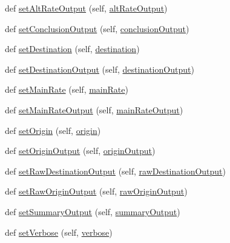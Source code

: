 \begin{DoxyCompactItemize}
def \hyperlink{classe2e_1_1_parameters_a47d3280dcce660c7227ca8c817859d84}{set\+Alt\+Rate\+Output} (self, \hyperlink{classe2e_1_1_parameters_ab0fc4de0f4d6d135eea22cae77536807}{alt\+Rate\+Output})
\item 
def \hyperlink{classe2e_1_1_parameters_a4ec249739947f4643b6d2dc811ef2639}{set\+Conclusion\+Output} (self, \hyperlink{classe2e_1_1_parameters_ad5967b78ebf5c8778e423413053015a7}{conclusion\+Output})
\item 
def \hyperlink{classe2e_1_1_parameters_ac63ae6d2b5f45ae78ee855953a038f14}{set\+Destination} (self, \hyperlink{classe2e_1_1_parameters_ad2cdf746b8890c53a9cab6fd7df7043b}{destination})
\item 
def \hyperlink{classe2e_1_1_parameters_a96083de53012ca50d2a345a1673802de}{set\+Destination\+Output} (self, \hyperlink{classe2e_1_1_parameters_a3b4ae5aa9b73466e51018b6f37792577}{destination\+Output})
\item 
def \hyperlink{classe2e_1_1_parameters_a8cea2f8656650dfbc2f4b9c13bce46a4}{set\+Main\+Rate} (self, \hyperlink{classe2e_1_1_parameters_a3d473f94dbb62a1488945cf6abc9f108}{main\+Rate})
\item 
def \hyperlink{classe2e_1_1_parameters_a930e9e6cafab4096286754a473617232}{set\+Main\+Rate\+Output} (self, \hyperlink{classe2e_1_1_parameters_acff858a94aecf1e5a553273e8acd9eca}{main\+Rate\+Output})
\item 
def \hyperlink{classe2e_1_1_parameters_a421e56e53ff0aaf5222229d8a81c456b}{set\+Origin} (self, \hyperlink{classe2e_1_1_parameters_aff4d7aaa35295f7f71e546fe5554c4d9}{origin})
\item 
def \hyperlink{classe2e_1_1_parameters_a2b87a3357a16d35b7606a97e924a4904}{set\+Origin\+Output} (self, \hyperlink{classe2e_1_1_parameters_ab1ac2fc0ab2f3ef169b776c776cdb225}{origin\+Output})
\item 
def \hyperlink{classe2e_1_1_parameters_a2a4420c79bef43533fe2d9562d0faedb}{set\+Raw\+Destination\+Output} (self, \hyperlink{classe2e_1_1_parameters_a84b319098084ed505e089a600e154f6e}{raw\+Destination\+Output})
\item 
def \hyperlink{classe2e_1_1_parameters_a6a69b8936b79b34f612b3dda7bedc67f}{set\+Raw\+Origin\+Output} (self, \hyperlink{classe2e_1_1_parameters_a62b586d9863422872833e34814ac51e6}{raw\+Origin\+Output})
\item 
def \hyperlink{classe2e_1_1_parameters_af904cdd913f0ffd64f28c9f7b1137389}{set\+Summary\+Output} (self, \hyperlink{classe2e_1_1_parameters_a1f4bab2e746d2c598e20ccba0154d795}{summary\+Output})
\item 
def \hyperlink{classe2e_1_1_parameters_a9d1ef6cf9aaac08105966db43687423f}{set\+Verbose} (self, \hyperlink{classe2e_1_1_parameters_a84d862bf507bb0325f5daf3b7e5d9ab3}{verbose})
\end{DoxyCompactItemize}

